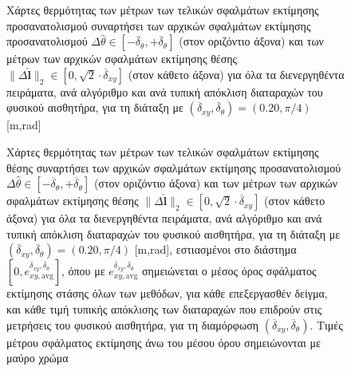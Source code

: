 \begin{figure}\vspace{1cm}\hspace{0.5cm}
  
  \vspace{1cm}
  \caption{\small Χάρτες θερμότητας των μέτρων των τελικών σφαλμάτων εκτίμησης
           προσανατολισμού συναρτήσει των αρχικών σφαλμάτων εκτίμησης
           προσανατολισμού $\Delta\hat{\theta} \in
           [-\overline{\delta}_{\theta},+\overline{\delta}_{\theta}]$ (στον
           οριζόντιο άξονα) και των μέτρων των αρχικών σφαλμάτων εκτίμησης
           θέσης $\|\Delta \hat{\bm{l}}\|_2 \in [0, \sqrt{2}\cdot
           \overline{\delta}_{xy}]$ (στον κάθετο άξονα) για όλα τα
           διενεργηθέντα πειράματα, ανά αλγόριθμο και ανά τυπική απόκλιση
           διαταραχών του φυσικού αισθητήρα, για τη διάταξη με
           $(\overline{\delta}_{xy}, \overline{\delta}_{\theta}) = (0.20,
           \pi/4)$ [m,rad]}
  \label{fig:02_05_03:02:05}
\end{figure}


\begin{figure}\vspace{1cm}\hspace{0.5cm}
  
  \vspace{1cm}
  \caption{\small Χάρτες θερμότητας των μέτρων των τελικών σφαλμάτων εκτίμησης
           θέσης συναρτήσει των αρχικών σφαλμάτων εκτίμησης προσανατολισμού
           $\Delta\hat{\theta} \in
           [-\overline{\delta}_{\theta},+\overline{\delta}_{\theta}]$ (στον
           οριζόντιο άξονα) και των μέτρων των αρχικών σφαλμάτων εκτίμησης
           θέσης $\|\Delta \hat{\bm{l}}\|_2 \in [0, \sqrt{2}\cdot
           \overline{\delta}_{xy}]$ (στον κάθετο άξονα) για όλα τα
           διενεργηθέντα πειράματα, ανά αλγόριθμο και ανά τυπική απόκλιση
           διαταραχών του φυσικού αισθητήρα, για τη διάταξη με
           $(\overline{\delta}_{xy}, \overline{\delta}_{\theta}) = (0.20,
           \pi/4)$ [m,rad], εστιασμένοι στο διάστημα $[0,
           e_{xy,\text{avg}}^{\overline{\delta}_{xy},
           \overline{\delta}_{\theta}}]$, όπου με
           $e_{xy,\text{avg}}^{\overline{\delta}_{xy},
           \overline{\delta}_{\theta}}$ σημειώνεται ο μέσος όρος σφάλματος
           εκτίμησης στάσης όλων των μεθόδων, για κάθε επεξεργασθέν δείγμα, και
           κάθε τιμή τυπικής απόκλισης των διαταραχών που επιδρούν στις
           μετρήσεις του φυσικού αισθητήρα, για τη διαμόρφωση
           $(\overline{\delta}_{xy}, \overline{\delta}_{\theta})$.  Τιμές
           μέτρου σφάλματος εκτίμησης άνω του μέσου όρου σημειώνονται με μαύρο
           χρώμα}
  \label{fig:02_05_03:02:06}
\end{figure}


